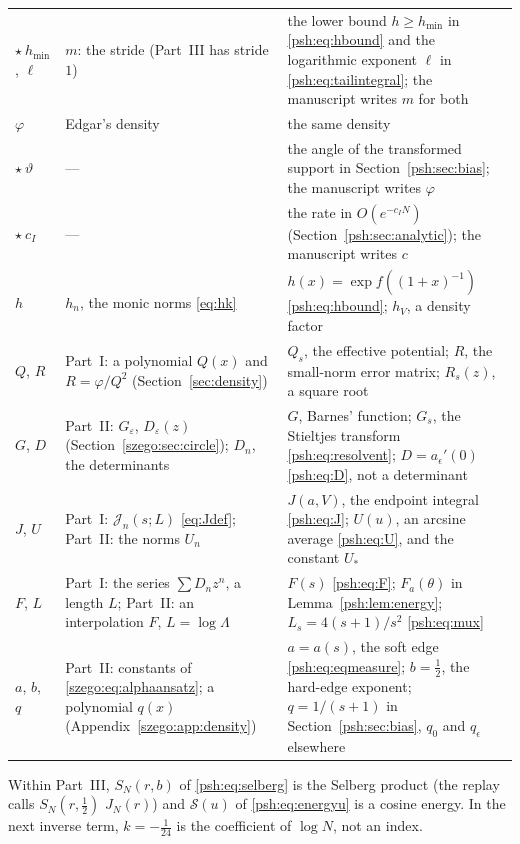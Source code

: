 \documentclass[11pt,a4paper]{article}
\numberwithin{equation}{section}
\theoremstyle{remark}\newtheorem{remark}[theorem]{Remark}
\newcommand{\J}{\mathcal J}
\begin{document}
\begin{table}[p]
\begin{tabular}{>{\raggedright\arraybackslash}p{}>{\raggedright\arraybackslash}p{}>{\raggedright\arraybackslash}p{}}
$\star\ h_{\min}$, $\ell$ & $m$: the stride (Part~III has stride $1$) & the lower bound $h\geq h_{\min}$ in \eqref{psh:eq:hbound} and the logarithmic exponent $\ell$ in \eqref{psh:eq:tailintegral}; the manuscript writes $m$ for both\\[2pt]
$\varphi$ & Edgar's density & the same density\\
$\star\ \vartheta$ & --- & the angle of the transformed support in Section~\ref{psh:sec:bias}; the manuscript writes $\varphi$\\
$\star\ c_I$ & --- & the rate in $O(e^{-c_IN})$ (Section~\ref{psh:sec:analytic}); the manuscript writes $c$\\[2pt]
$h$ & $h_n$, the monic norms \eqref{eq:hk} & $h(x)=\exp f((1+x)^{-1})$ \eqref{psh:eq:hbound}; $h_V$, a density factor \\[2pt]
$Q$, $R$ & Part~I: a polynomial $Q(x)$ and $R=\varphi/Q^2$ (Section~\ref{sec:density}) & $Q_s$, the effective potential; $R$, the small-norm error matrix; $R_s(z)$, a square root\\[2pt]
$G$, $D$ & Part~II: $G_\varepsilon$, $D_\varepsilon(z)$ (Section~\ref{szego:sec:circle}); $D_n$, the determinants & $G$, Barnes' function; $G_s$, the Stieltjes transform \eqref{psh:eq:resolvent}; $D=a_\epsilon'(0)$ \eqref{psh:eq:D}, not a determinant\\[2pt]
$J$, $U$ & Part~I: $\J_n(s;L)$ \eqref{eq:Jdef}; Part~II: the norms $U_n$ & $J(a,V)$, the endpoint integral \eqref{psh:eq:J}; $U(u)$, an arcsine average \eqref{psh:eq:U}, and the constant $U_*$\\[2pt]
$F$, $L$ & Part~I: the series $\sum D_nz^n$, a length $L$; Part~II: an interpolation $F$, $L=\log\Lambda$ & $F(s)$ \eqref{psh:eq:F}; $F_a(\theta)$ in Lemma~\ref{psh:lem:energy}; $L_s=4(s+1)/s^2$ \eqref{psh:eq:mux}\\[2pt]
$a$, $b$, $q$ & Part~II: constants of \eqref{szego:eq:alphaansatz}; a polynomial $q(x)$ (Appendix~\ref{szego:app:density}) & $a=a(s)$, the soft edge \eqref{psh:eq:eqmeasure}; $b=\frac12$, the hard-edge exponent; $q=1/(s+1)$ in Section~\ref{psh:sec:bias}, $q_0$ and $q_\epsilon$ elsewhere\\
\bottomrule
\end{tabular}
\end{table}

\noindent Within Part~III, $S_N(r,b)$ of \eqref{psh:eq:selberg} is the Selberg
product (the replay calls $S_N(r,\frac12)$ $J_N(r)$) and $\mathcal S(u)$ of
\eqref{psh:eq:energyu} is a cosine energy. In the next inverse term,
$k=-\frac1{24}$ is the coefficient of $\log N$, not an index.
\end{document}
